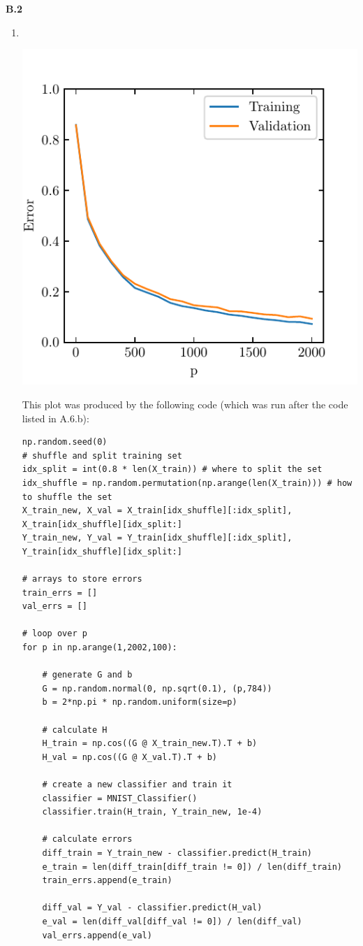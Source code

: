 \documentclass{article}
\begin{document}
\textbf{B.2}
\begin{enumerate}
        \item \,
        \vspace{-7mm}
        \begin{center}
                \includegraphics[width=0.5\linewidth]{code/B2a.pdf}
        \end{center}
        This plot was produced by the following code (which was run after the code listed in A.6.b):
        \begin{verbatim}
np.random.seed(0)
# shuffle and split training set
idx_split = int(0.8 * len(X_train)) # where to split the set
idx_shuffle = np.random.permutation(np.arange(len(X_train))) # how to shuffle the set
X_train_new, X_val = X_train[idx_shuffle][:idx_split], X_train[idx_shuffle][idx_split:]
Y_train_new, Y_val = Y_train[idx_shuffle][:idx_split], Y_train[idx_shuffle][idx_split:]

# arrays to store errors
train_errs = []
val_errs = []

# loop over p
for p in np.arange(1,2002,100):
    
    # generate G and b
    G = np.random.normal(0, np.sqrt(0.1), (p,784))
    b = 2*np.pi * np.random.uniform(size=p)
    
    # calculate H
    H_train = np.cos((G @ X_train_new.T).T + b)
    H_val = np.cos((G @ X_val.T).T + b)
    
    # create a new classifier and train it
    classifier = MNIST_Classifier()
    classifier.train(H_train, Y_train_new, 1e-4)
    
    # calculate errors
    diff_train = Y_train_new - classifier.predict(H_train)
    e_train = len(diff_train[diff_train != 0]) / len(diff_train)
    train_errs.append(e_train)
    
    diff_val = Y_val - classifier.predict(H_val)
    e_val = len(diff_val[diff_val != 0]) / len(diff_val)
    val_errs.append(e_val)
    

\end{verbatim}
\end{enumerate}
\end{document}

